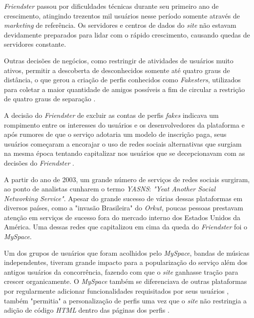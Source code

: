 
\textit{Friendster} passou por dificuldades técnicas durante seu primeiro ano de crescimento, atingindo trezentos mil usuários nesse período somente através de \textit{marketing} de referência. Os servidores e centros de dados do \textit{site} não estavam devidamente preparados para lidar com o rápido crescimento, causando quedas de servidores constante. 

Outras decisões de negócios, como restringir de atividades de usuários muito ativos, permitir a descoberta de desconhecidos somente até quatro graus de distância, o que gerou a criação de perfis conhecidos como \textit{Fakesters}, utilizados para coletar a maior quantidade de amigos possíveis a fim de circular a restrição de quatro graus de separação .

A decisão do \textit{Friendster} de excluir as contas de perfis \textit{fakes} indicava um rompimento entre os interesses do usuários e os desenvolvedores da plataforma e após rumores de que o serviço adotaria um modelo de inscrição paga, seus usuários começaram a encorajar o uso de redes sociais alternativas que surgiam na mesma época tentando capitalizar nos usuários que se decepcionavam com as decisões do \textit{Friendster} .

A partir do ano de 2003, um grande número de serviços de redes sociais surgiram, ao ponto de analistas cunharem o termo \textit{YASNS}: \textit{"Yeat Another Social Networking Service"}. %
Apesar do grande sucesso de várias dessas plataformas em diversos países, como a "invasão Brasileira" do \textit{Orkut}, %
poucas pessoas prestavam atenção em serviços de sucesso fora do mercado interno dos Estados Unidos da América. Uma dessas redes que capitalizou em cima da queda do \textit{Friendster} foi o \textit{MySpace}. 

Um dos grupos de usuários que foram acolhidos pelo \textit{MySpace}, bandas de músicas independentes, tiveram grande impacto para a popularização do serviço além dos antigos usuários da concorrência, fazendo com que o \textit{site} ganhasse tração para crescer organicamente. O \textit{MySpace} também se diferenciava de outras plataformas por regularmente adicionar funcionalidades requisitados por seus usuários %
, também "permitia" a personalização de perfis uma vez que o \textit{site} não restringia a adição de código \textit{HTML} dentro das páginas dos perfis .

